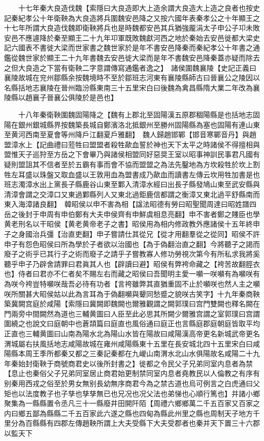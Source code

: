 　　十七年秦大良造伐魏【索隱曰大良造即大上造余謂大良造大上造之良者也按史記秦紀孝公十年衛鞅為大良造將兵圍魏安邑降之又按六國年表秦孝公之十年顯王之十七年所謂大良造伐魏即衛鞅將兵也是時魏都安邑其兵猶強龎涓太子申公子卭未敗安邑不應遽降於秦至顯王二十九年卭軍既敗魏獻河西之地於秦始去安邑徙都大梁史記六國表不書徙大梁而世家書之魏世家於是年不書安邑降秦而秦紀孝公十年書之通鑑從魏世家於顯王二十九年書魏去安邑徙大梁而是年不書魏安邑降秦蓋亦疑而除去之但大良造之下當有衛鞅二字意謂傳寫通鑑者逸之】　諸侯圍魏襄陵【史記正義曰襄陵故城在兖州鄒縣余按魏境時不至於鄒班志河東有襄陵縣師古曰晉襄公之陵因以名縣括地志襄陵在晉州臨汾縣東南三十五里宋白曰後魏為禽昌縣隋大業二年改為襄陵縣以趙襄子晉襄公俱陵於是邑也】

　　十八年秦衛鞅圍魏固陽降之【魏有上郡北至固陽漢五原郡稒陽縣是也括地志固陽在銀州銀城縣界按魏築長城自鄭濱洛北抵銀州至勝州固陽縣為塞也固陽有連山東至黄河西南至夏會等州降戶江翻夏戶雅翻】　魏人歸趙邯鄲【邯音寒鄲音丹】與趙盟漳水上【記曲禮曰蒞牲曰盟盟者殺牲歃血誓於神也天下太平之時諸侯不得擅相與盟惟天子巡狩至方岳之下會畢乃與諸侯相盟同好惡奨王室以昭事神訓民事君凡國有疑則盟詛其不信者至於五霸有事而會不協而盟盟之為法先鑿地為方坎殺牲於坎上割牲左耳盛以珠盤又取血盛以王敦用血為盟書成乃歃血而讀書左傳云坎用牲加書是也班志濁漳水出上黨長子縣鹿谷山東至鄴入清漳水經曰出長子縣發鳩山東至武安縣與清漳會謂之交漳口又東過鄴縣列人又東北過鉅鹿信都謂之衡漳又東北過平舒縣南而東入海漳諸良翻】　韓昭侯以申不害為相【諡法昭德有勞曰昭聖聞周達曰昭姓譜四岳之後封于申周有申伯鄭有大夫申侯齊有申鮮虞相息亮翻】申不害者鄭之賤臣也學黄老刑名以干昭侯【黄老黄帝老子之書】昭侯用為相内修政教外應諸侯十五年終申子之身國治兵彊【治直吏翻】申子嘗請仕其從兄【從才用翻羣從之從同】昭侯不許申子有怨色昭侯曰所為學於子者欲以治國也【為于偽翻治直之翻】今將聽子之謁而廢子之術乎已其行子之術而廢子之請乎子嘗教寡人修功勞視次第今有所私求我將奚聽乎申子乃辟舍請罪曰君眞其人也【辟讀曰避】昭侯有弊袴命藏之【袴苦故翻脛衣也】侍者曰君亦不仁者矣不賜左右而藏之昭侯曰吾聞明主愛一嚬一咲嚬有為嚬咲有為咲今袴豈特嚬咲哉吾必待有功者【言袴雖弊其直猶重固不止於嚬咲也然人主之嚬咲所關甚大昭侯姑以此為言耳為于偽翻嚬與顰同愁蹙之貌咲古笑字】十九年秦商鞅築冀闕宫庭於咸陽【索隱曰冀闕即魏闕也爾雅觀謂之闕郭璞曰宫門雙闕也釋名闕在門兩旁中間闕然為道也三輔黄圖曰人臣至此必思其所闕少爾雅宫謂之室郭璞曰宫謂圍繞之也說文曰庭朝中也蒼頡篇曰庭直也風俗通曰庭正也言縣庭郡庭朝庭皆取平均正直也三輔黄圖曰山南為陽水北為陽山水皆在陽故曰咸陽漢高帝更名新城武帝更名渭城屬右扶風括地志咸陽故城在雍州咸陽縣東十五里在長安城北四十五里宋白曰咸陽縣本周王季所都秦又都之三秦記秦都在九嵕山南渭水北山水俱陽故名咸陽二十九年秦始封衛鞅于商號商君史以後所封書之】徙都之令民父子兄弟同室内息者為禁【息止也秦俗父子兄弟同室居止商君始更制禁同室内息者堯教民以人倫教之有序有别秦用西戎之俗至於男女無别長幼無序商君今為之禁古道也烏可例言之白虎通曰父矩也以法度教子也子孳也孳孳無已也兄况也况父法也弟悌也心順行篤也】并諸小鄉聚集為一縣縣置令丞凡三十一縣廢井田開阡陌【周禮六鄉鄉萬二千五百家又百家之内曰鄉五鄙為縣縣二千五百家此六遂之縣也四甸為縣此州里之縣也周制天子地方千里分為百縣縣有四郡左傳趙鞅所謂上大夫受縣下大夫受郡者也秦并天下置三十六郡以監天下